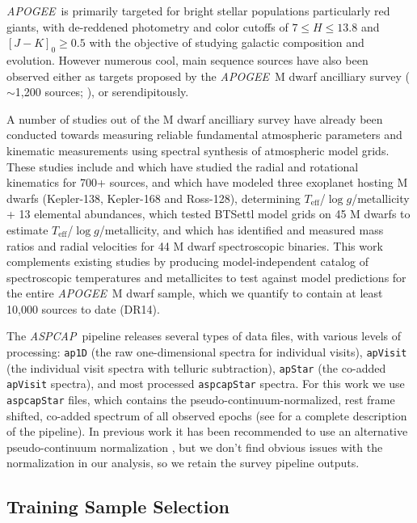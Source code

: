 \documentclass[modern]{aastex62}
\newcommand{\apogee}{\textsl{APOGEE}}
\newcommand{\aspcap}{\textsl{ASPCAP}}
\newcommand{\teff}{T_{\mathrm{eff}}}
\newcommand{\logg}{\log g}
\begin{document}
\apogee\ is primarily targeted for bright stellar populations particularly red giants, with de-reddened photometry and color cutoffs of $7 \leq H \leq 13.8$ and $[J-K]_0 \geq 0.5$ \citep{Zasowski:2013} with the objective of studying galactic composition and evolution. However numerous cool, main sequence sources have also been observed either as targets proposed by the \apogee\ M dwarf ancilliary survey ($\sim$1,200 sources; \citealt{Desphande:2013}), or serendipitously. 

A number of studies out of the M dwarf ancilliary survey have already been conducted towards measuring reliable fundamental atmospheric parameters and kinematic measurements using spectral synthesis of atmospheric model grids. 
These studies include \citealt{Desphande:2013} and \citealt{Gilhool:2018} which have studied the radial and rotational kinematics for 700+ sources,
\citealt{Souto:2017} and \citealt{Souto:2018} which have modeled three exoplanet hosting M dwarfs (Kepler-138, Kepler-168 and Ross-128), determining $\teff$/$\logg$/metallicity + 13 elemental abundances,
\citealt{Rajpurohit:2018} which tested BTSettl model grids \citep{Allard:2012} on 45 M dwarfs to estimate $\teff$/$\logg$/metallicity,
and \citealt{Skinner:2018} which has identified and measured mass ratios and radial velocities for 44 M dwarf spectroscopic binaries.
This work complements existing studies by producing model-independent catalog of spectroscopic temperatures and metallicites to test against model predictions for the entire \apogee\ M dwarf sample, which we quantify to contain at least 10,000 sources to date (DR14).

The \aspcap\ pipeline releases several types of data files, with various levels of processing: {\tt\string ap1D} (the raw one-dimensional spectra for individual visits), {\tt\string apVisit} (the individual visit spectra with telluric subtraction), {\tt\string apStar} (the co-added {\tt\string apVisit} spectra), and most processed {\tt\string aspcapStar} spectra. For this work we use {\tt\string aspcapStar} files, which contains the pseudo-continuum-normalized, rest frame shifted, co-added spectrum of all observed epochs (see \citealt{Perez:2016} for a complete description of the pipeline).
In previous work it has been recommended to use an alternative pseudo-continuum normalization \citep{Ness:2015}, but we don't find obvious issues with the normalization in our analysis, so we retain the survey pipeline outputs.
 
\subsection{Training Sample Selection}
\end{document}
